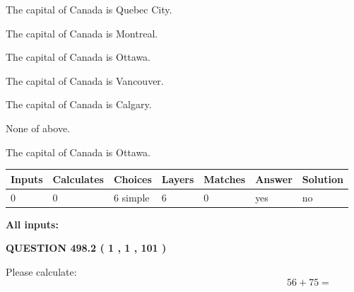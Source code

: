 \documentclass[12pt]{article}
\begin{document}
 
The capital of Canada is Quebec City.
 
 
The capital of Canada is Montreal.
 
 
The capital of Canada is Ottawa.
 
 
The capital of Canada is Vancouver.
 
 
The capital of Canada is Calgary.
 
 
 None of above.
 
 
\noindent{}
 
 
The capital of Canada is Ottawa.
 
 
\noindent{}
 
 
   
   
   
   
\noindent\begin{tabular}{|l|l|l|l|l|l|l|}
 \hline
Inputs & Calculates & Choices & Layers & Matches & Answer & Solution \\ \hline
 0  & 
 0  & 
 6
  simple  
  & 
 6  & 
 0  & 
  yes & 
  no 
  \\ \hline
 \end{tabular}
   
   
   
   
\noindent{}
   
   
   
   
\noindent\vspace{0.1in}\hspace{-0.08in} {\textbf{\Large{All inputs: }}}
   
   
  
\vspace{0.2in}
  
{\textbf{\Large{QUESTION
498.2 
 ( 1 , 1 , 101 )
}}}
  
  
 
Please calculate:
\begin{equation}
56 +  %
75 = \nonumber
\end{equation}
 
 
 
\noindent{}
 
\end{document}
